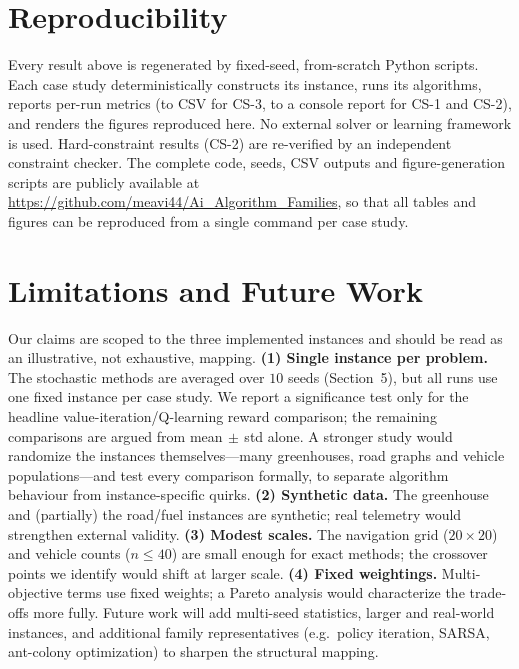 \documentclass[10pt]{article}
\begin{document}
\section{Reproducibility}
Every result above is regenerated by fixed-seed, from-scratch Python scripts.
Each case study deterministically constructs its instance, runs its algorithms,
reports per-run metrics (to CSV for CS-3, to a console report for CS-1 and CS-2),
and renders the figures reproduced here. No
external solver or learning framework is used. Hard-constraint results (CS-2) are
re-verified by an independent constraint checker. The complete code, seeds, CSV
outputs and figure-generation scripts are publicly available at
\url{https://github.com/meavi44/Ai_Algorithm_Families}, so that all tables and
figures can be reproduced from a single command per case study.

\section{Limitations and Future Work}
Our claims are scoped to the three implemented instances and should be read as an
illustrative, not exhaustive, mapping. \textbf{(1) Single instance per problem.}
The stochastic methods are averaged over $10$ seeds (Section~5), but all runs use
one fixed instance per case study. We report a significance test only for the
headline value-iteration/Q-learning reward comparison; the remaining comparisons
are argued from mean$\,\pm\,$std alone. A stronger study would randomize the
instances themselves---many greenhouses, road graphs and vehicle
populations---and test every comparison formally, to separate algorithm behaviour
from instance-specific quirks. \textbf{(2)
Synthetic data.} The greenhouse and (partially) the road/fuel instances are
synthetic; real telemetry would strengthen external validity. \textbf{(3) Modest
scales.} The navigation grid ($20\times20$) and vehicle counts ($n\le40$) are
small enough for exact methods; the crossover points we identify would shift at
larger scale. \textbf{(4) Fixed weightings.} Multi-objective terms use fixed
weights; a Pareto analysis would characterize the trade-offs more fully. Future
work will add multi-seed statistics, larger and real-world instances, and
additional family representatives (e.g.\ policy iteration, SARSA, ant-colony
optimization) to sharpen the structural mapping.
\end{document}
